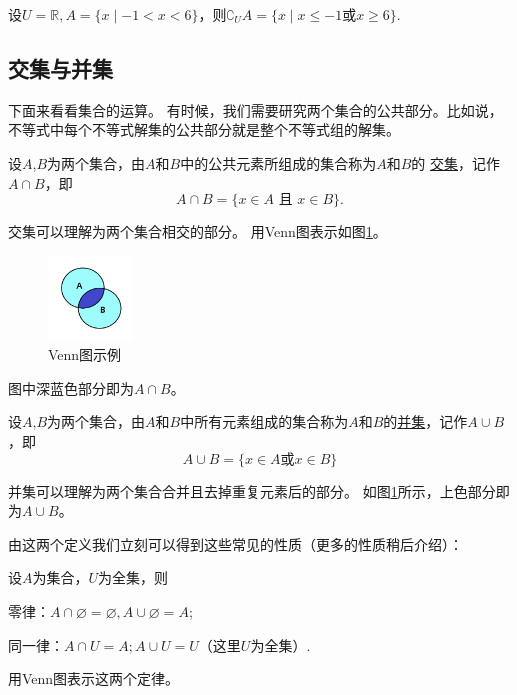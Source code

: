 \documentclass[lang=cn,math=cm,chinesefont=nofont,11pt,scheme=chinese,onecol]{elegantbook}
\begin{document}
\begin{example}
  设$U=\mathbb{R},A=\{x\mid -1<x<6\}$，则$\complement_{U}A=\{x\mid x\leq -1\text{或}x\geq 6\}.$
\end{example}

\subsection{交集与并集}
下面来看看集合的运算。
有时候，我们需要研究两个集合的公共部分。比如说，不等式中每个不等式解集的公共部分就是整个不等式组的解集。
\begin{definition}[交集]
  设$A$,$B$为两个集合，由$A$和$B$中的公共元素所组成的集合称为$A$和$B$的
  \underline{交集}，记作$A\cap B$，即$$A\cap B=\{x\in A\text{ 且 }x\in B\}.$$
\end{definition}
  交集可以理解为两个集合相交的部分。
  用Venn图表示如图\ref{img:Venn2}。
  \begin{figure}[h]
    \centering
    \includegraphics[width=0.2\textwidth]{image/Venn2.png}
    \caption{Venn图示例}
    \label{img:Venn2}
  \end{figure}
  图中深蓝色部分即为$A\cap B$。

\begin{definition}
  设$A$,$B$为两个集合，由$A$和$B$中所有元素组成的集合称为$A$和$B$的\underline{并集}，记作$A\cup B$，即
  $$A\cup B=\{x\in A\text{或}x\in B\}$$
\end{definition}
  并集可以理解为两个集合合并且去掉重复元素后的部分。
  如图\ref{img:Venn2}所示，上色部分即为$A\cup B$。 

由这两个定义我们立刻可以得到这些常见的性质（更多的性质稍后介绍）：

设$A$为集合，$U$为全集，则
\begin{property}
  零律：$A\cap\varnothing =\varnothing,A\cup\varnothing=A$;
\end{property}
\begin{property}
  同一律：$A\cap U=A;A\cup U=U$（这里$U$为全集）.
\end{property}

\begin{exercise}\label{exer:10}
  用Venn图表示这两个定律。
\end{exercise}
\end{document}

